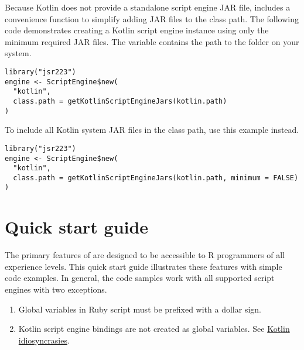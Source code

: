 Because Kotlin does not provide a standalone script engine JAR file,  includes a convenience function  to simplify adding JAR files to the class path. The following code demonstrates creating a Kotlin script engine instance using only the minimum required JAR files. The  variable contains the path to the  folder on your system.

\begin{verbatim}
library("jsr223")
engine <- ScriptEngine$new(
  "kotlin",
  class.path = getKotlinScriptEngineJars(kotlin.path)
)
\end{verbatim}
To include all Kotlin system JAR files in the class path, use this example instead.

\begin{verbatim}
library("jsr223")
engine <- ScriptEngine$new(
  "kotlin",
  class.path = getKotlinScriptEngineJars(kotlin.path, minimum = FALSE)
)
\end{verbatim}


\hypertarget{quickstartguide}{\section{Quick start guide}}

The primary features of  are designed to be accessible to R programmers of all experience levels. This quick start guide illustrates these features with simple code examples. In general, the code samples work with all supported script engines with two exceptions.

\begin{enumerate}
\item Global variables in Ruby script must be prefixed with a dollar sign.
\item Kotlin script engine bindings are not created as global variables. See \hyperlink{kotlinidiosyncrasies}{Kotlin idiosyncrasies}.
\end{enumerate}

